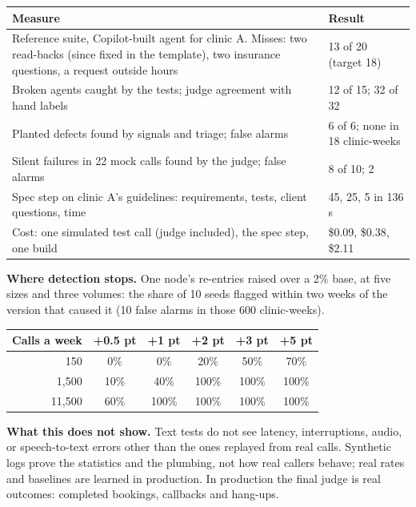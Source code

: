 \documentclass[11pt,a4paper]{article}
\begin{document}
\begin{center}\small
\begin{tabularx}{\linewidth}{@{}X l@{}}
\toprule
\textbf{Measure} & \textbf{Result} \\
\midrule
Reference suite, Copilot-built agent for clinic A. Misses: two read-backs (since fixed in the template), two insurance questions, a request outside hours & 13 of 20 (target 18) \\
Broken agents caught by the tests; judge agreement with hand labels & 12 of 15; 32 of 32 \\
Planted defects found by signals and triage; false alarms & 6 of 6; none in 18 clinic-weeks \\
Silent failures in 22 mock calls found by the judge; false alarms & 8 of 10; 2 \\
Spec step on clinic A's guidelines: requirements, tests, client questions, time & 45, 25, 5 in 136 s \\
Cost: one simulated test call (judge included), the spec step, one build & \$0.09, \$0.38, \$2.11 \\
\bottomrule
\end{tabularx}
\end{center}

\noindent\begin{minipage}[c]{0.5\linewidth}
\textbf{Where detection stops.} One node's re-entries raised over a 2\% base, at five sizes and three volumes: the share of 10 seeds flagged within two weeks of the version that caused it (10 false alarms in those 600 clinic-weeks).
\end{minipage}\hfill
\begin{minipage}[c]{0.47\linewidth}\footnotesize\setlength{\tabcolsep}{3.5pt}
\begin{tabular}{@{}r ccccc@{}}
\toprule
Calls a week & +0.5 pt & +1 pt & +2 pt & +3 pt & +5 pt \\
\midrule
150 & 0\% & 0\% & 20\% & 50\% & 70\% \\
1,500 & 10\% & 40\% & 100\% & 100\% & 100\% \\
11,500 & 60\% & 100\% & 100\% & 100\% & 100\% \\
\bottomrule
\end{tabular}
\end{minipage}

\smallskip

\textbf{What this does not show.} Text tests do not see latency, interruptions, audio, or speech-to-text errors other than the ones replayed from real calls. Synthetic logs prove the statistics and the plumbing, not how real callers behave; real rates and baselines are learned in production. In production the final judge is real outcomes: completed bookings, callbacks and hang-ups.
\end{document}
